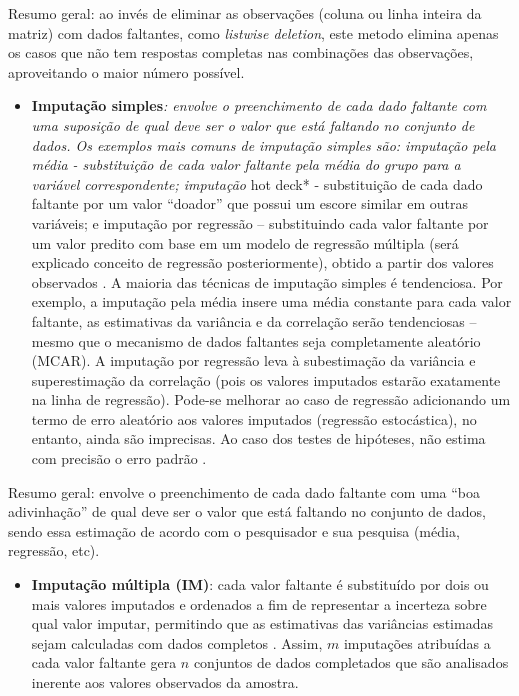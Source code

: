 \documentclass[
  openany]{book}
\providecommand{\tightlist}{%
  \setlength{\itemsep}{0pt}\setlength{\parskip}{0pt}}
\begin{document}
Resumo geral: ao invés de eliminar as observações (coluna ou linha inteira da matriz) com dados faltantes, como \emph{listwise deletion}, este metodo elimina apenas os casos que não tem respostas completas nas combinações das observações, aproveitando o maior número possível.

\begin{itemize}
\tightlist
\item
  \textbf{Imputação simples}\emph{: envolve o preenchimento de cada dado
  faltante com uma suposição de qual deve ser o valor que está
  faltando no conjunto de dados. Os exemplos mais comuns de imputação simples são: imputação pela média - substituição de cada valor faltante pela média do grupo para a variável correspondente; imputação }hot deck* - substituição de cada dado faltante por um valor ``doador'' que possui um escore similar em outras variáveis; e imputação por regressão -- substituindo cada valor faltante por um valor predito com base em um modelo de regressão múltipla (será explicado conceito de regressão posteriormente), obtido a partir dos valores observados \citep{tecnicasinput}. A maioria das técnicas de imputação simples é tendenciosa. Por exemplo, a imputação pela média insere uma média constante para cada valor faltante, as estimativas da variância e da correlação serão tendenciosas -- mesmo que o mecanismo de dados faltantes seja completamente aleatório (MCAR). A imputação por regressão leva à subestimação da variância e superestimação da correlação (pois os valores imputados estarão exatamente na linha de regressão). Pode-se melhorar ao caso de regressão adicionando um termo de erro aleatório aos valores imputados (regressão estocástica), no entanto, ainda são imprecisas. Ao caso dos testes de hipóteses, não estima com precisão o erro padrão \citep{tecnicasinput}.
\end{itemize}

Resumo geral: envolve o preenchimento de cada dado faltante com uma ``boa adivinhação'' de qual deve ser o valor que está faltando no conjunto de dados, sendo essa estimação de acordo com o pesquisador e sua pesquisa (média, regressão, etc).

\begin{itemize}
\tightlist
\item
  \textbf{Imputação múltipla (IM)}: cada valor faltante é substituído por dois ou mais valores imputados e ordenados a fim de representar a incerteza sobre qual valor imputar, permitindo que as estimativas das variâncias estimadas sejam calculadas com dados completos \citep{rubin2004multiple}. Assim, \(m\) imputações atribuídas a cada valor faltante gera \(n\) conjuntos de dados completados que são analisados inerente aos valores observados da amostra.
\end{itemize}
\end{document}
